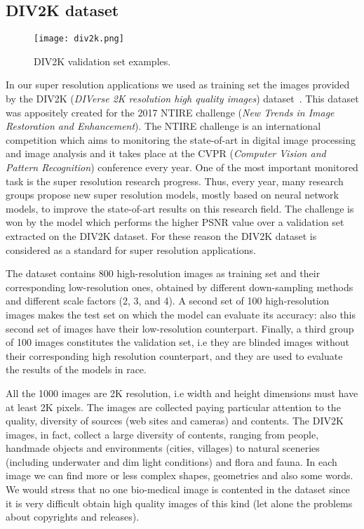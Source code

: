 \documentclass{standalone}
\begin{document}
\subsection[DIV2K dataset]{DIV2K dataset}\label{SR:div2k}

\begin{center}
\begin{figure}[htbp]
\centering
\texttt{[image: div2k.png]}
\caption{DIV2K validation set examples.
}
\label{fig:div2k}
\end{figure}
\end{center}

In our super resolution applications we used as training set the images provided by the DIV2K (\emph{DIVerse 2K resolution high quality images}) dataset~\cite{Agustsson_2017_CVPR_Workshops}.
This dataset was appositely created for the 2017 NTIRE challenge (\emph{New Trends in Image Restoration and Enhancement}).
The NTIRE challenge is an international competition which aims to monitoring the state-of-art in digital image processing and image analysis and it takes place at the CVPR (\emph{Computer Vision and Pattern Recognition}) conference every year.
One of the most important monitored task is the super resolution research progress.
Thus, every year, many research groups propose new super resolution models, mostly based on neural network models, to improve the state-of-art results on this research field.
The challenge is won by the model which performs the higher PSNR value over a validation set extracted on the DIV2K dataset.
For these reason the DIV2K dataset is considered as a standard for super resolution applications.

The dataset contains 800 high-resolution images as training set and their corresponding low-resolution ones, obtained by different down-sampling methods and different scale factors (2, 3, and 4).
A second set of 100 high-resolution images makes the test set on which the model can evaluate its accuracy: also this second set of images have their low-resolution counterpart.
Finally, a third group of 100 images constitutes the validation set, i.e they are blinded images without their corresponding high resolution counterpart, and they are used to evaluate the results of the models in race.

All the 1000 images are 2K resolution, i.e width and height dimensions must have at least 2K pixels.
The images are collected paying particular attention to the quality, diversity of sources (web sites and cameras) and contents.
The DIV2K images, in fact, collect a large diversity of contents, ranging from people, handmade objects and environments (cities, villages) to natural sceneries (including underwater and dim light conditions) and flora and fauna.
In each image we can find more or less complex shapes, geometries and also some words.
We would stress that no one bio-medical image is contented in the dataset since it is very difficult obtain high quality images of this kind (let alone the problems about copyrights and releases).
\end{document}
